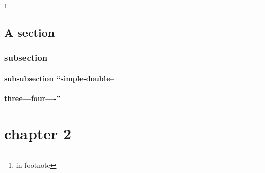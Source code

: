 \documentclass{book}
\begin{document}
\footnote{in footnote}


\section{{A section}}
\label{anchor:s_002d_002dect_002cion}%


\subsection{{subsection}}
\label{anchor:subsection}%


\label{anchor:anchor}%

\subsubsection{{subsubsection ``simple-double--}}
\label{anchor:subsubsection-_0060_0060simple_002ddouble_002d_002d}%

\subsubsection{{three---four----''}}
\label{anchor:subsubsection-three_002d_002d_002dfour_002d_002d_002d_002d_0027_0027}%

\chapter*{{\centering chapter 2}}
\label{anchor:chapter2}%

\printindex[cp]
\printindex[fn]
\end{document}
